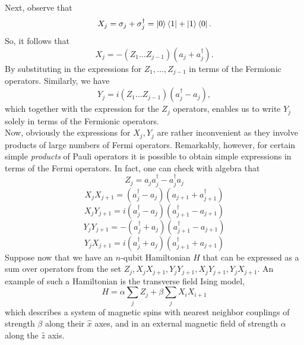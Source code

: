 \documentclass{book}
\theoremstyle{definition}
\newcommand{\al}{\alpha}
\newcommand{\be}{\beta}
\begin{document}
Next, observe that 
\begin{equation}
X_j = \sigma_j + \sigma_j^\dagger = \ket{0}\bra{1} + \ket{1}\bra{0}. 
\end{equation}
So, it follows that
\begin{equation}
\boxed{X_j = -(Z_1\dots Z_{j-1}) (a_j + a_j^\dagger). }
\end{equation}
By substituting in the expressions for $Z_1,\dots,Z_{j-1}$ in terms of the Fermionic operators. Similarly, we have 
\begin{equation}
\boxed{Y_j = i(Z_1\dots Z_{j-1})(a_j^\dagger - a_j) ,}
\end{equation}
which together with the expression for the $Z_j$ operators, enables us to write $Y_j$ solely in terms of the Fermionic operators.\\

Now, obviously the expressions for $X_j,Y_j$ are rather inconvenient as they involve products of large numbers of Fermi operators. Remarkably, however, for certain simple \textit{products} of Pauli operators it is possible to obtain simple expressions in terms of the Fermi operators. In fact, one can check with algebra that
\begin{equation}
\boxed{Z_j = a_j a^\dagger_j - a_j^\dagger a_j}
\end{equation}
\begin{equation}
\boxed{ X_j X_{j+1}  = (a_j^\dagger - a_j )(a_{j+1} + a_{j+1}^\dagger) }
\end{equation}
\begin{equation}
\boxed{X_jY_{j+1} = i(a_j^\dagger - a_j)(a_{j+1}^\dagger - a_{j+1})}
\end{equation}
\begin{equation}
\boxed{ Y_j Y_{j+1} = -(a_j^\dagger + a_j)(a_{j+1}^\dagger - a_{j+1}) }
\end{equation}
\begin{equation}
\boxed{ Y_j X_{j+1} = i(a_j^\dagger + a_j)(a_{j+1}^\dagger + a_{j+1}) }
\end{equation}
Suppose now that we have an $n$-qubit Hamiltonian $H$ that can be expressed as a sum over operators from the set $Z_j, X_j X_{j+1},Y_jY_{j+1}, X_j Y_{j+1}, Y_jX_{j+1}$. An example of such a Hamiltonian is the transverse field Ising model,
\begin{equation}
H = \al\sum_j Z_j + \be \sum_j X_i X_{i+1}
\end{equation}
which describes a system of magnetic spins with nearest neighbor couplings of strength $\beta$ along their $\hat{x}$ axes, and in an external magnetic field of strength $\al$ along the $\hat{z}$ axis. \\
\end{document}
